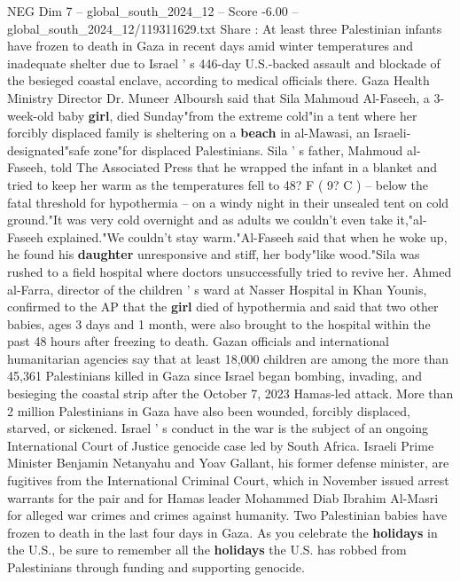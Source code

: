 \begin{textsample}{NEG Dim 7 – global\_south\_2024\_12 – Score -6.00 – global\_south\_2024\_12/119311629.txt}  \label{ex:f7_neg_293}
Share : At least three Palestinian infants have frozen to death in Gaza in recent days amid winter temperatures and inadequate shelter due to Israel ' s 446-day U.S.-backed assault and blockade of the besieged coastal enclave, according to medical officials there.
Gaza Health Ministry Director Dr.
Muneer Alboursh said that Sila Mahmoud Al-Faseeh, a 3-week-old baby \textbf{girl}, died Sunday"from the extreme cold"in a tent where her forcibly displaced family is sheltering on a \textbf{beach} in al-Mawasi, an Israeli-designated"safe zone"for displaced Palestinians.
Sila ' s father, Mahmoud al-Faseeh, told The Associated Press that he wrapped the infant in a blanket and tried to keep her warm as the temperatures fell to 48?
F ( 9?
C ) -- below the fatal threshold for hypothermia -- on a windy night in their unsealed tent on cold ground."It was very cold overnight and as adults we couldn't even take it,"al-Faseeh explained."We couldn't stay warm."Al-Faseeh said that when he woke up, he found his \textbf{daughter} unresponsive and stiff, her body"like wood."Sila was rushed to a field hospital where doctors unsuccessfully tried to revive her.
Ahmed al-Farra, director of the children ' s ward at Nasser Hospital in Khan Younis, confirmed to the AP that the \textbf{girl} died of hypothermia and said that two other babies, ages 3 days and 1 month, were also brought to the hospital within the past 48 hours after freezing to death.
Gazan officials and international humanitarian agencies say that at least 18,000 children are among the more than 45,361 Palestinians killed in Gaza since Israel began bombing, invading, and besieging the coastal strip after the October 7, 2023 Hamas-led attack.
More than 2 million Palestinians in Gaza have also been wounded, forcibly displaced, starved, or sickened.
Israel ' s conduct in the war is the subject of an ongoing International Court of Justice genocide case led by South Africa.
Israeli Prime Minister Benjamin Netanyahu and Yoav Gallant, his former defense minister, are fugitives from the International Criminal Court, which in November issued arrest warrants for the pair and for Hamas leader Mohammed Diab Ibrahim Al-Masri for alleged war crimes and crimes against humanity.
Two Palestinian babies have frozen to death in the last four days in Gaza.
As you celebrate the \textbf{holidays} in the U.S., be sure to remember all the \textbf{holidays} the U.S. has robbed from Palestinians through funding and supporting genocide.

\end{textsample}
